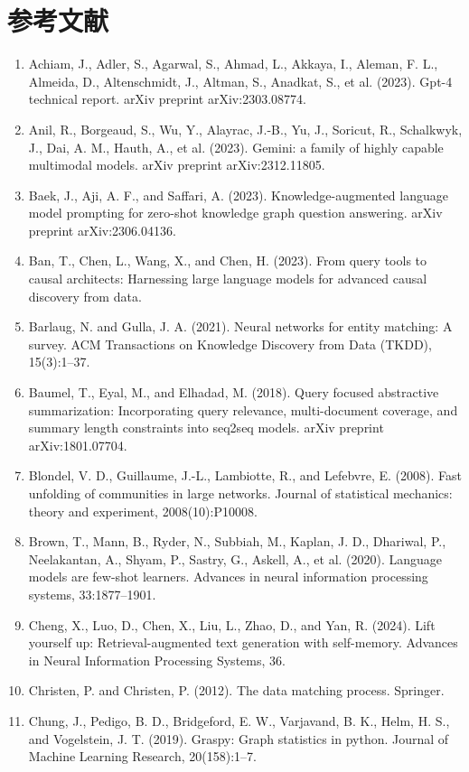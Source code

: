 \documentclass[11pt,UTF8,fontset=fandol]{ctexart}
\begin{document}
\section*{参考文献}
\begin{enumerate}[leftmargin=2em]
\item Achiam, J., Adler, S., Agarwal, S., Ahmad, L., Akkaya, I., Aleman, F. L., Almeida, D., Altenschmidt, J., Altman, S., Anadkat, S., et al. (2023). Gpt-4 technical report. arXiv preprint arXiv:2303.08774.
\item Anil, R., Borgeaud, S., Wu, Y., Alayrac, J.-B., Yu, J., Soricut, R., Schalkwyk, J., Dai, A. M., Hauth, A., et al. (2023). Gemini: a family of highly capable multimodal models. arXiv preprint arXiv:2312.11805.
\item Baek, J., Aji, A. F., and Saffari, A. (2023). Knowledge-augmented language model prompting for zero-shot knowledge graph question answering. arXiv preprint arXiv:2306.04136.
\item Ban, T., Chen, L., Wang, X., and Chen, H. (2023). From query tools to causal architects: Harnessing large language models for advanced causal discovery from data.
\item Barlaug, N. and Gulla, J. A. (2021). Neural networks for entity matching: A survey. ACM Transactions on Knowledge Discovery from Data (TKDD), 15(3):1--37.
\item Baumel, T., Eyal, M., and Elhadad, M. (2018). Query focused abstractive summarization: Incorporating query relevance, multi-document coverage, and summary length constraints into seq2seq models. arXiv preprint arXiv:1801.07704.
\item Blondel, V. D., Guillaume, J.-L., Lambiotte, R., and Lefebvre, E. (2008). Fast unfolding of communities in large networks. Journal of statistical mechanics: theory and experiment, 2008(10):P10008.
\item Brown, T., Mann, B., Ryder, N., Subbiah, M., Kaplan, J. D., Dhariwal, P., Neelakantan, A., Shyam, P., Sastry, G., Askell, A., et al. (2020). Language models are few-shot learners. Advances in neural information processing systems, 33:1877--1901.
\item Cheng, X., Luo, D., Chen, X., Liu, L., Zhao, D., and Yan, R. (2024). Lift yourself up: Retrieval-augmented text generation with self-memory. Advances in Neural Information Processing Systems, 36.
\item Christen, P. and Christen, P. (2012). The data matching process. Springer.
\item Chung, J., Pedigo, B. D., Bridgeford, E. W., Varjavand, B. K., Helm, H. S., and Vogelstein, J. T. (2019). Graspy: Graph statistics in python. Journal of Machine Learning Research, 20(158):1--7.

\end{enumerate}
\end{document}
